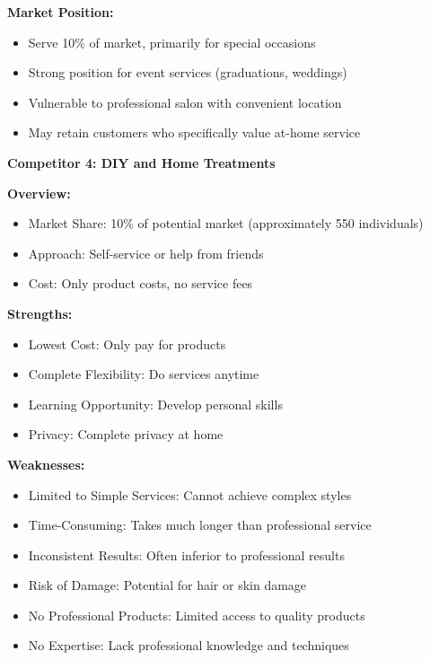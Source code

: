 \documentclass[a4paper,12pt]{article}
\begin{document}
\textbf{Market Position:}
\begin{itemize}[leftmargin=2em]
    \item Serve 10\% of market, primarily for special occasions
    \item Strong position for event services (graduations, weddings)
    \item Vulnerable to professional salon with convenient location
    \item May retain customers who specifically value at-home service
\end{itemize}

\vspace{1em}

\textbf{Competitor 4: DIY and Home Treatments}

\textbf{Overview:}
\begin{itemize}[leftmargin=2em]
    \item Market Share: 10\% of potential market (approximately 550 individuals)
    \item Approach: Self-service or help from friends
    \item Cost: Only product costs, no service fees
\end{itemize}

\textbf{Strengths:}
\begin{itemize}[leftmargin=2em]
    \item Lowest Cost: Only pay for products
    \item Complete Flexibility: Do services anytime
    \item Learning Opportunity: Develop personal skills
    \item Privacy: Complete privacy at home
\end{itemize}

\textbf{Weaknesses:}
\begin{itemize}[leftmargin=2em]
    \item Limited to Simple Services: Cannot achieve complex styles
    \item Time-Consuming: Takes much longer than professional service
    \item Inconsistent Results: Often inferior to professional results
    \item Risk of Damage: Potential for hair or skin damage
    \item No Professional Products: Limited access to quality products
    \item No Expertise: Lack professional knowledge and techniques
\end{itemize}
\end{document}
